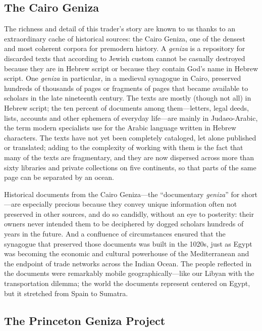 \documentclass{article}
\begin{document}
\subsection{The Cairo Geniza}

The richness and detail of this trader’s story are known to us thanks to an extraordinary cache of historical sources: the Cairo Geniza, one of the densest and most coherent corpora for premodern history. A \textit{geniza} is a repository for discarded texts that according to Jewish custom cannot be casually destroyed because they are in Hebrew script or because they contain God’s name in Hebrew script. One \textit{geniza} in particular, in a medieval synagogue in Cairo, preserved hundreds of thousands of pages or fragments of pages that became available to scholars in the late nineteenth century. The texts are mostly (though not all) in Hebrew script; the ten percent of documents among them—letters, legal deeds, lists, accounts and other ephemera of everyday life—are mainly in Judaeo-Arabic, the term modern specialists use for the Arabic language written in Hebrew characters. The texts have not yet been completely cataloged, let alone published or translated; adding to the complexity of working with them is the fact that many of the texts are fragmentary, and they are now dispersed across more than sixty libraries and private collections on five continents, so that parts of the same page can be separated by an ocean.

Historical documents from the Cairo Geniza—the “documentary \textit{geniza}” for short—are especially precious because they convey unique information often not preserved in other sources, and do so candidly, without an eye to posterity: their owners never intended them to be deciphered by dogged scholars hundreds of years in the future. And a confluence of circumstances ensured that the synagogue that preserved those documents was built in the 1020s, just as Egypt was becoming the economic and cultural powerhouse of the Mediterranean and the endpoint of trade networks across the Indian Ocean. The people reflected in the documents were remarkably mobile geographically—like our Libyan with the transportation dilemma; the world the documents represent centered on Egypt, but it stretched from Spain to Sumatra. 

\subsection{The Princeton Geniza Project}
\end{document}
